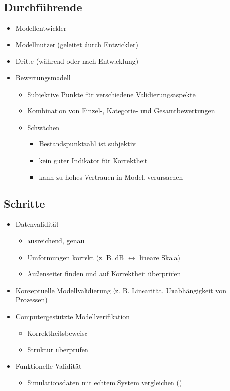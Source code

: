 \documentclass[nonacm=true, language=german]{acmart}
\begin{document}
\subsection{Durchführende}

\begin{itemize}
    \item Modellentwickler
    \item Modellnutzer (geleitet durch Entwickler)
    \item Dritte (während oder nach Entwicklung)
    \item Bewertungsmodell
    \begin{itemize}
        \item Subjektive Punkte für verschiedene Validierungsaspekte
        \item Kombination von Einzel-, Kategorie- und Gesamtbewertungen
        \item Schwächen
        \begin{itemize}
            \item Bestandspunktzahl ist subjektiv
            \item kein guter Indikator für Korrektheit
            \item kann zu hohes Vertrauen in Modell verursachen
        \end{itemize}
    \end{itemize}
\end{itemize}

\subsection{Schritte}

\begin{itemize}
    \item Datenvalidität
    \begin{itemize}
        \item ausreichend, genau
        \item Umformungen korrekt (z. B. dB $\leftrightarrow$ lineare Skala)
        \item Außenseiter finden und auf Korrektheit überprüfen
    \end{itemize}
    \item Konzeptuelle Modellvalidierung (z. B. Linearität, Unabhängigkeit von Prozessen)
    \item Computergestützte Modellverifikation
    \begin{itemize}
        \item Korrektheitsbeweise
        \item Struktur überprüfen
    \end{itemize}
    \item Funktionelle Validität
    \begin{itemize}
        \item Simulationsdaten mit echtem System vergleichen ()
    \end{itemize}
\end{itemize}
\end{document}
